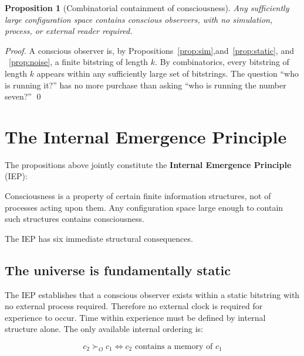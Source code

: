 \documentclass[12pt,a4paper]{article}
\newtheorem{proposition}{Proposition}
\begin{document}
\begin{proposition}[Combinatorial containment of consciousness]
\label{prop:combinatorial}
Any sufficiently large configuration space contains conscious observers,
with no simulation, process, or external reader required.
\end{proposition}

\begin{proof}
  A conscious observer is, by Propositions~\ref{prop:sim},and~\ref{prop:static},
  and ~\ref{prop:noise},
a finite bitstring of length $k$. By combinatorics, every bitstring of length
$k$ appears within any sufficiently large set of bitstrings. The question
``who is running it?'' has no more purchase than asking ``who is running the
number seven?'' \qed
\end{proof}

\section{The Internal Emergence Principle}
\label{sec:iep}

The propositions above jointly constitute the \textbf{Internal Emergence
Principle} (IEP):

\begin{tcolorbox}[title=Internal Emergence Principle]
Consciousness is a property of certain finite information structures, not of
processes acting upon them. Any configuration space large enough to contain
such structures contains consciousness.
\end{tcolorbox}

The IEP has six immediate structural consequences.

\subsection*{The universe is fundamentally static}
\label{subs:static-universe}

The IEP establishes that a conscious observer exists within a static bitstring
with no external process required. Therefore no external clock is required for
experience to occur. Time within experience must be defined by internal
structure alone. The only available internal ordering is:

\begin{equation}
c_2 \succ_O c_1 \iff c_2 \text{ contains a memory of } c_1
\end{equation}
\end{document}
